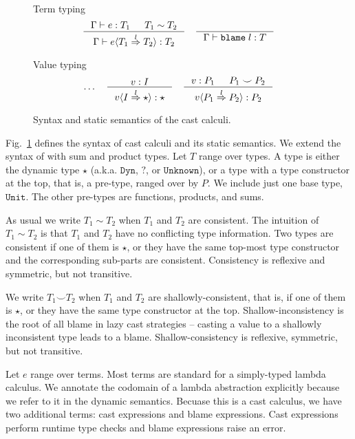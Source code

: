 \documentclass[acmsmall,review,anonymous]{acmart}\settopmatter{printfolios=true,printccs=false,printacmref=false}
\newcommand{\figref}[1]{Fig.~\ref{#1}}
\newcommand{\judgetype}[3]{#1 \vdash #2 : #3}
\newcommand{\TOOdyn}[0]{\star}
\newcommand{\POOunit}[0]{\mathtt{Unit}}
\newcommand{\eOOcast}[4]{#1 \langle \cOOcast{#2}{#3}{#4} \rangle}
\newcommand{\eOOblame}[1]{\mathtt{blame} \; #1}
\newcommand{\cOOcast}[3]{#1 \overset{#2}{\Rightarrow} #3}
\newcommand{\vOOcast}[2]{#1\langle#2\rangle}
\begin{document}
\begin{figure}
	Term typing
	\fbox{$ \judgetype{\Gamma}{e}{T} $}
	\begin{gather*}
		\inference{
			\Gamma \vdash e : T_1 & T_1 \sim T_2
		}{
			\judgetype{\Gamma}{\eOOcast{e}{T_1}{l}{T_2}}{T_2}
		} \quad
		\inference{
		}{
			\judgetype{\Gamma}{\eOOblame{l}}{T}
		}
	\end{gather*}
	
	Value typing 
	\begin{gather*}
	\dots \quad
	\inference{
		v : I
	}{
		\vOOcast{v}{\cOOcast{I}{l}{\TOOdyn}} : \TOOdyn
	}
	\quad
	\inference{
		v : P_1 &
		P_1 \smile P_2
	}{
		\vOOcast{v}{\cOOcast{P_1}{l}{P_2}} : P_2
	}
	\end{gather*}

	\caption{Syntax and static semantics of the cast calculi.}
	\label{fig:blame-static}
\end{figure}

\figref{fig:blame-static} defines the syntax of cast calculi and its
static semantics. We extend the syntax of \citet{siek2009exploring}
with sum and product types.  Let $ T $ range over types. A type is
either the dynamic type $ \star $ (a.k.a. $ \mathtt{Dyn} $, $
\mathbb{?} $, or $ \mathtt{Unknown} $), or a type with a type
constructor at the top, that is, a pre-type, ranged over by $ P $. We
include just one base type, $\POOunit$. The other pre-types are
functions, products, and sums.

As usual we write $ T_1 \sim T_2 $ when $ T_1 $ and $ T_2 $ are
consistent. The intuition of $ T_1 \sim T_2 $ is that $ T_1 $ and $
T_2 $ have no conflicting type information. Two types are consistent
if one of them is $ \star $, or they have the same top-most type
constructor and the corresponding sub-parts are
consistent. Consistency is reflexive and symmetric, but not
transitive.

We write $ T_1 \smile T_2 $ when $ T_1 $ and $ T_2 $ are
shallowly-consistent, that is, if one of them is $ \star $, or they
have the same type constructor at the top. Shallow-inconsistency is
the root of all blame in lazy cast strategies -- casting a value to a
shallowly inconsistent type leads to a blame. Shallow-consistency is
reflexive, symmetric, but not transitive.

Let $ e $ range over terms. Most terms are standard for a simply-typed
lambda calculus. We annotate the codomain of a lambda abstraction
explicitly because we refer to it in the dynamic semantics. Becuase
this is a cast calculus, we have two additional terms: cast
expressions and blame expressions. Cast expressions perform runtime
type checks and blame expressions raise an error.
\end{document}
